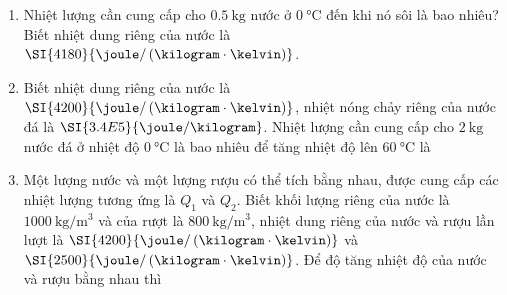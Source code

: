 \begin{enumerate}[label=\bfseries Câu \arabic*:, leftmargin=1.7cm]
\item Nhiệt lượng cần cung cấp cho $\SI{0.5}{\kilogram}$ nước ở $\SI{0}{\celsius}$ đến khi nó sôi là bao nhiêu? Biết nhiệt dung riêng của nước là $\SI{4180}{\joule/\left(\kilogram\cdot\kelvin\right)}$.

\item Biết nhiệt dung riêng của nước là $\SI{4200}{\joule/\left(\kilogram\cdot\kelvin\right)}$, nhiệt nóng chảy riêng của nước đá là $\SI{3.4E5}{\joule/\kilogram}$. Nhiệt lượng cần cung cấp cho $\SI{2}{\kilogram}$ nước đá ở nhiệt độ $\SI{0}{\celsius}$ là bao nhiêu để tăng nhiệt độ lên $\SI{60}{\celsius}$ là

\item Một lượng nước và một lượng rượu có thể tích bằng nhau, được cung cấp các nhiệt lượng tương ứng là $Q_1$ và $Q_2$. Biết khối lượng riêng của nước là $\SI{1000}{\kilogram/\meter^3}$ và của rượt là $\SI{800}{\kilogram/\meter^3}$, nhiệt dung riêng của nước và rượu lần lượt là $\SI{4200}{\joule/\left(\kilogram\cdot\kelvin\right)}$ và $\SI{2500}{\joule/\left(\kilogram\cdot\kelvin\right)}$. Để độ tăng nhiệt độ của nước và rượu bằng nhau thì


\end{enumerate}
